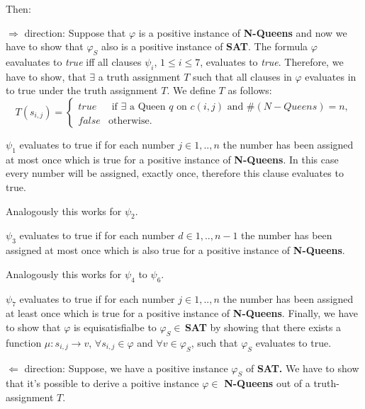 \bigskip

\noindent Then:

\medskip

\noindent $\Rightarrow $ direction:\newline
Suppose that $\varphi $ is a positive instance of \textbf{N-Queens} and now
we have to show that $\varphi _{S}$ also is a positive instance of \textbf{%
SAT}.\newline
The formula $\varphi $ eavaluates to \textit{true} iff all clauses $\psi _{i}
$, $1\leq i\leq 7$, evaluates to \textit{true}. Therefore, we have to show,
that $\exists $ a truth assignment $T$ such that all clauses in $\varphi $
evaluates in  to true under the truth assignment $T$. We define $T$ as follows:%
\newline
\begin{equation*}
T(s_{i,j})=\left\{ 
\begin{array}{cl}
true & \text{ if }\exists \text{ a Queen }q\text{ on }c(i,j)\text{ and }%
\#(N-Queens)=n, \\ 
false & \text{otherwise.}%
\end{array}%
\right. 
\end{equation*}

$\psi _{1}$ evaluates to true if for each number $j\in {1,..,n}$ the number
has been assigned at most once which is true for a positive instance of 
\textbf{N-Queens}. In this case every number will be assigned, exactly once,
therefore this clause evaluates to true.

Analogously this works for $\psi _{2}$.

$\psi _{3}$ evaluates to true if for each number $d\in {1,..,n-1}$ the
number has been assigned at most once which is also true for a positive
instance of \textbf{N-Queens}.

Analogously this works for $\psi _{4}$ to $\psi _{6}$.

$\psi _{7}$ evaluates to true if for each number $j\in {1,..,n}$ the number
has been assigned at least once which is true for a positive instance of 
\textbf{N-Queens}. Finally, we have to show that $\varphi $ is equisatisfialbe to $%
\varphi _{S}\in \,$\textbf{SAT} by showing that there exists a function $\mu
:s_{i,j}\rightarrow v$, $\forall s_{i,j}\in \varphi $ and $\forall v\in
\varphi _{S}$, such that $\varphi _{S}$ evaluates to true.

\bigskip

\noindent $\Leftarrow $ direction:\newline
Suppose, we have a positive instance $\varphi _{S}$ of \textbf{SAT.} We have
to show that it's possible to derive a poitive instance $\varphi \in $ 
\textbf{N-Queens} out of a truth-assignment $T$.


